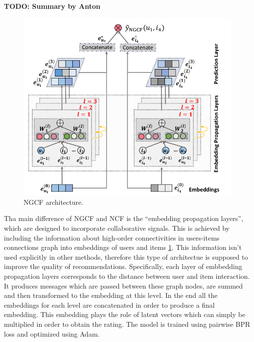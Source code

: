 \textbf{TODO: Summary by Anton}
\begin{figure}[h]
    \centering
    \includegraphics[width=0.8\linewidth]{images/ngcf.png}
    \caption{NGCF architecture.}
    \label{fig:ngcf}
\end{figure}

Tha main difference of NGCF \cite{wang2019neural} and NCF is the ``embedding propagation layers'', which are 
designed to incorporate collaborative signals.
This is achieved by including the information about high-order connectivities 
in users-items connections graph into embeddings of users and items \ref{fig:ngcf}.
This information isn't used explicitly in other methods, therefore this type 
of architectue is supposed to improve the quality of recommendations.
Specifically, each layer of embbedding propagation layers corresponds 
to the distance between user and item interaction. It produces messages which 
are passed between these graph nodes, are summed and then transformed to the 
embedding at this level.
In the end all the embeddings for each level are concatenated in order to produce a final embedding.
This embedding plays the role of latent vectors which can simply be multiplied in order to obtain the rating.
The model is trained using pairwise BPR loss and optimized using Adam.